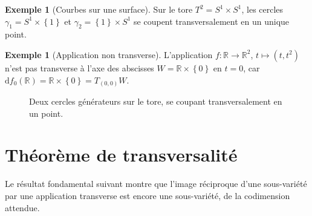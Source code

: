 \documentclass[12pt,a4paper,openany]{book}
\theoremstyle{definition}
\newtheorem{exemple}[definition]{Exemple}
\theoremstyle{plain}
\theoremstyle{remark}
\newcommand{\R}{\mathbb{R}}
\newcommand{\dd}{\mathrm{d}}
\newcommand{\set}[1]{\left\{#1\right\}}
\begin{document}
\begin{exemple}[Courbes sur une surface]\label{ex:courbes-surface}
Sur le tore $T^2 = S^1 \times S^1$, les cercles
$\gamma_1 = S^1 \times \set{1}$ et $\gamma_2 = \set{1} \times S^1$ se
coupent transversalement en un unique point.
\end{exemple}

\begin{exemple}[Application non transverse]\label{ex:application-non-transverse}
L'application $f \colon \R \to \R^2$, $t \mapsto (t, t^2)$ n'est pas
transverse à l'axe des abscisses $W = \R \times \set{0}$ en $t = 0$, car
$\dd f_0(\R) = \R \times \set{0} = T_{(0,0)} W$.
\end{exemple}

\begin{figure}[ht]
\centering
{}
\caption{Deux cercles générateurs sur le tore, se coupant
  transversalement en un point.}
\label{fig:courbes-tore}
\end{figure}

\section{Théorème de transversalité}\label{sec:thm-transversalite}

Le résultat fondamental suivant montre que l'image réciproque d'une
sous-variété par une application transverse est encore une sous-variété,
de la codimension attendue.
\end{document}
